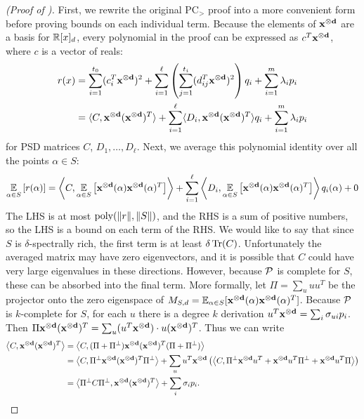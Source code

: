 \begin{proof}[(Proof of )]
First, we rewrite the original PC$_>$ proof into a more convenient form before proving bounds on each individual term. Because the elements of $\mathbf{x^{\otimes d}}$ are a basis for $\mathbb R[x]_d$, every polynomial in the proof can be expressed as $c^T\mathbf{x^{\otimes d}}$, where $c$ is a vector of reals:
\begin{align*} r(x) &= \sum_{i=1}^{t_0} (c_i^T\mathbf{x^{\otimes d}})^2 + \sum_{i=1}^\ell \left(\sum_{j=1}^{t_i} (d_{ij}^T\mathbf{x^{\otimes d}})^2\right)q_i + \sum_{i=1}^m \lambda_i p_i \\
&= \langle C, \mathbf{x^{\otimes d}}(\mathbf{x^{\otimes d}})^T\rangle + \sum_{i=1}^\ell \langle D_i, \mathbf{x^{\otimes d}}(\mathbf{x^{\otimes d}})^T\rangle q_i + \sum_{i=1}^m \lambda_i p_i
\end{align*}
for PSD matrices $C$, $D_1,\dots,D_\ell$. Next, we average this polynomial identity over all the points $\alpha \in S$:
\begin{align*}
\operatorname*{\mathbb{E}}_{\alpha \in S}\left[r(\alpha)\right] &= \left\langle C, \operatorname*{\mathbb{E}}_{\alpha \in S}\left[\mathbf{x^{\otimes d}}(\alpha)\mathbf{x^{\otimes d}}(\alpha)^T\right]\right\rangle + \sum_{i=1}^\ell \left\langle D_i, \operatorname*{\mathbb{E}}_{\alpha \in S}\left[\mathbf{x^{\otimes d}}(\alpha)\mathbf{x^{\otimes d}}(\alpha)^T\right]\right\rangle q_i(\alpha) + 0 \\
\end{align*}
The LHS is at most $\operatorname{poly}(\|r\|, \|S\|)$, and the RHS is a sum of positive numbers, so the LHS is a bound on each term of the RHS. 
%
We would like to say that since $S$ is $\delta$-spectrally rich, the first term is at least $\delta \operatorname{Tr}(C)$. 
%
Unfortunately the averaged matrix may have zero eigenvectors, and it is possible that $C$ could have very large eigenvalues in these directions. 
%
However, because $\mathcal P$ is complete for $S$, these can be absorbed into the final term. More formally, let $\Pi = \sum_u uu^T$ be the projector onto the zero eigenspace of $M_{S,d} = \operatorname*{\mathbb{E}}_{\alpha \in S}[\mathbf{x^{\otimes d}}(\alpha)\mathbf{x^{\otimes d}}(\alpha)^T]$. Because $\mathcal P$ is $k$-complete for $S$, for each $u$ there is a degree $k$ derivation $u^T\mathbf{x^{\otimes d}} = \sum_i \sigma_{ui} p_i$. Then $\Pi \mathbf{x^{\otimes d}}(\mathbf{x^{\otimes d}})^T = \sum_u (u^T\mathbf{x^{\otimes d}}) \cdot u(\mathbf{x^{\otimes d}})^T$. Thus we can write
\begin{align*}
\left\langle C, \mathbf{x^{\otimes d}}(\mathbf{x^{\otimes d}})^T\right\rangle &= \left\langle C, (\Pi + \Pi^\perp)\mathbf{x^{\otimes d}}(\mathbf{x^{\otimes d}})^T(\Pi + \Pi^\perp)\right\rangle \\
&= \left\langle C, \Pi^\perp \mathbf{x^{\otimes d}}(\mathbf{x^{\otimes d}})^T \Pi^\perp\right\rangle + \sum_u u^T\mathbf{x^{\otimes d}}\left(\left\langle C, \Pi^\perp \mathbf{x^{\otimes d}} u^T + \mathbf{x^{\otimes d}} u^T\Pi^\perp + \mathbf{x^{\otimes d}} u^T\Pi\right\rangle\right) \\
&= \left\langle\Pi^\perp C \Pi^\perp, \mathbf{x^{\otimes d}}(\mathbf{x^{\otimes d}})^T\right\rangle + \sum_i \sigma_i p_i.
\end{align*}

\end{proof}
